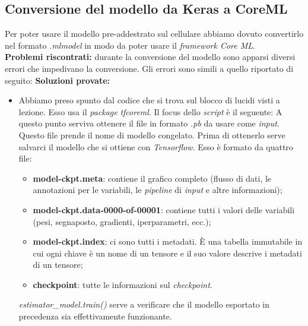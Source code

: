 \subsection{Conversione del modello da Keras a CoreML}
Per poter usare il modello pre-addestrato sul cellulare abbiamo dovuto convertirlo nel formato \textit{.mlmodel} in modo da poter usare il \textit{framework Core ML}.\\
\newline
\textbf{Problemi riscontrati:} durante la conversione del modello sono apparsi diversi errori che impedivano la conversione. Gli errori sono simili a quello riportato di seguito:
\vspace*{2ex}
\vspace*{2ex}
\textbf{Soluzioni provate:}
\begin{itemize}
	\item Abbiamo preso spunto dal codice che si trova sul blocco di lucidi visti a lezione. Esso usa il \textit{package} \textit{tfcoreml}. Il focus dello \textit{script} è il seguente:
	\vspace*{2ex}
	\vspace*{2ex}
	A questo punto serviva ottenere il file in formato \textit{.pb} da usare come \textit{input}. Questo file prende il nome di modello congelato. Prima di ottenerlo serve salvarci il modello che si ottiene con \textit{Tensorflow}. Esso è formato da quattro file:
	\begin{itemize}
		\item \textbf{model-ckpt.meta}: contiene il grafico completo (flusso di dati, le annotazioni per le variabili, le \textit{pipeline} di \textit{input} e altre informazioni);
     	\item \textbf{model-ckpt.data-0000-of-00001}: contiene tutti i valori delle variabili (pesi, segnaposto, gradienti, iperparametri, ecc.);
     	\item \textbf{model-ckpt.index}: ci sono tutti i metadati. È una tabella immutabile in cui ogni chiave è un nome di un tensore e il suo valore descrive i metadati di un tensore;
     	\item \textbf{checkpoint}: tutte le informazioni sul \textit{checkpoint}.
	\end{itemize}
	\vspace*{2ex}
	\vspace*{2ex}
	\textit{estimator\_model.train()} serve a verificare che il modello esportato in precedenza sia effettivamente funzionante.\\

\end{itemize}
